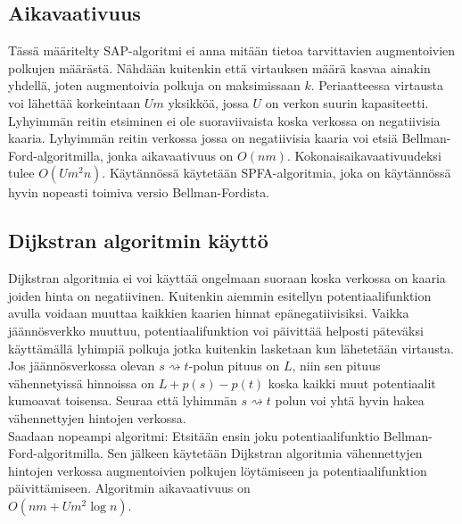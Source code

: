 \documentclass[a4paper, 11pt]{article}
\begin{document}
\subsection*{Aikavaativuus}
Tässä määritelty SAP-algoritmi ei anna mitään tietoa tarvittavien augmentoivien
polkujen määrästä. Nähdään kuitenkin että virtauksen määrä kasvaa ainakin yhdellä, joten
augmentoivia polkuja on maksimissaan $k$. Periaatteessa virtausta voi lähettää 
korkeintaan $Um$ yksikköä, jossa $U$ on verkon suurin kapasiteetti. Lyhyimmän reitin
etsiminen ei ole suoraviivaista koska verkossa on negatiivisia kaaria. Lyhyimmän reitin
verkossa jossa on negatiivisia kaaria
voi etsiä Bellman-Ford-algoritmilla, jonka aikavaativuus on $O(nm)$.
Kokonaisaikavaativuudeksi tulee $O(Um^2n)$. Käytännössä käytetään
SPFA-algoritmia, joka on käytännössä hyvin nopeasti toimiva versio Bellman-Fordista.
\subsection*{Dijkstran algoritmin käyttö}
Dijkstran algoritmia ei voi käyttää ongelmaan suoraan koska verkossa on kaaria joiden hinta on
negatiivinen. Kuitenkin aiemmin esitellyn potentiaalifunktion
avulla voidaan muuttaa kaikkien kaarien hinnat epänegatiivisiksi. 
Vaikka jäännösverkko muuttuu, potentiaalifunktion voi päivittää helposti päteväksi
käyttämällä lyhimpiä polkuja jotka kuitenkin lasketaan kun lähetetään virtausta.
Jos jäännösverkossa olevan $s \rightsquigarrow t$-polun pituus on $L$, niin
sen pituus vähennetyissä hinnoissa on $L + p(s) - p(t)$ koska kaikki muut potentiaalit
kumoavat toisensa. Seuraa että lyhimmän 
$s \rightsquigarrow t$ polun voi yhtä hyvin hakea vähennettyjen hintojen verkossa.\\
Saadaan nopeampi algoritmi: Etsitään ensin joku potentiaalifunktio Bellman-Ford-algoritmilla.
Sen jälkeen käytetään Dijkstran algoritmia vähennettyjen hintojen verkossa augmentoivien polkujen
löytämiseen ja potentiaalifunktion päivittämiseen. Algoritmin aikavaativuus on \\$O(nm + Um^2 \log n)$.
\end{document}
